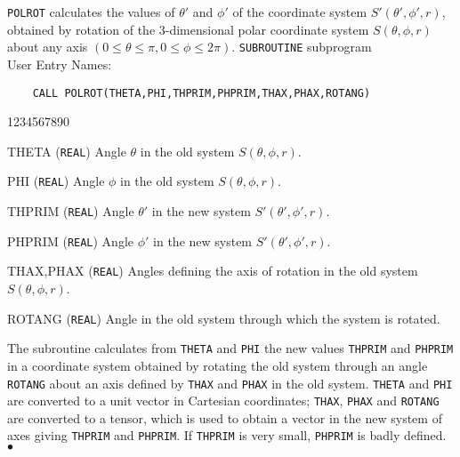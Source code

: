                     
                 
\Submitter{}                      
                
{\tt POLROT} calculates the values of
$\theta'$ and $\phi'$ of the coordinate system $S'(\theta',\phi',r)$,
obtained by rotation of the 3-dimensional polar coordinate system
$S(\theta,\phi,r)$ about any axis $(0\leq \theta \leq \pi,
0\leq \phi\leq 2\pi)$.
\Structure
{\tt SUBROUTINE} subprogram \\
User Entry Names: 
\Usage
\begin{verbatim}
    CALL POLROT(THETA,PHI,THPRIM,PHPRIM,THAX,PHAX,ROTANG)
\end{verbatim}
\begin{DLtt}{1234567890}
\item [THETA] ({\tt REAL}) Angle $\theta$  in the old system
$S(\theta,\phi,r)$.
\item [PHI] ({\tt REAL}) Angle $\phi$  in the old system
$S(\theta,\phi,r)$.
\item [THPRIM] ({\tt REAL}) Angle $\theta'$ in the new system
$S'(\theta',\phi',r)$.
\item [PHPRIM] ({\tt REAL}) Angle $\phi'$ in the new system
$S'(\theta',\phi',r)$.
\item [THAX,PHAX] ({\tt REAL}) Angles defining the axis of rotation in
the old system $S(\theta,\phi,r)$.
\item [ROTANG] ({\tt REAL}) Angle in the old system through which the
system is rotated.
\end{DLtt}
The subroutine calculates from {\tt THETA} and {\tt PHI} the new values
{\tt THPRIM} and {\tt PHPRIM} in a coordinate system obtained by
rotating the old system through an angle {\tt ROTANG} about
an axis defined by {\tt THAX} and {\tt PHAX} in the old system.
\Method
{\tt THETA} and {\tt PHI} are converted to a unit vector in Cartesian
coordinates; {\tt THAX}, {\tt PHAX} and {\tt ROTANG} are converted to a
tensor, which is used to obtain a vector in the new system of axes giving
{\tt THPRIM} and {\tt PHPRIM}.
\Notes
If {\tt THPRIM} is very small, {\tt PHPRIM} is badly defined.
\\ $\bullet$

